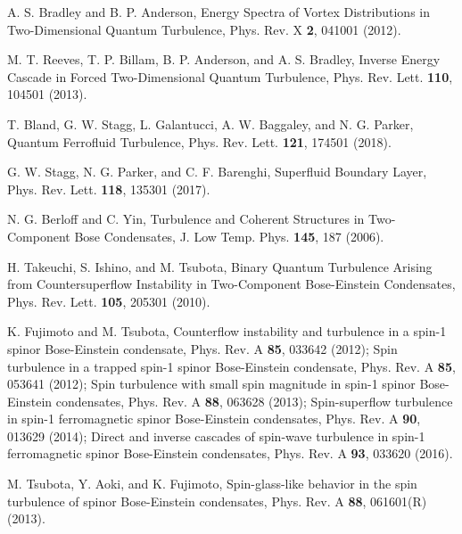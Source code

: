 \documentclass[12pt,a4paper]{jbook}
\begin{document}
\begin{thebibliography}{99}
        A. S. Bradley and B. P. Anderson,
        Energy Spectra of Vortex Distributions in Two-Dimensional Quantum
        Turbulence,
        Phys. Rev. X \textbf{2}, 041001 (2012).
        
        M. T. Reeves, T. P. Billam, B. P. Anderson, and A. S. Bradley,
        Inverse Energy Cascade in Forced Two-Dimensional Quantum Turbulence,
        Phys. Rev. Lett. \textbf{110}, 104501 (2013).
        
        T. Bland, G. W. Stagg, L. Galantucci, A. W. Baggaley, and N. G. Parker,
        Quantum Ferrofluid Turbulence,
        Phys. Rev. Lett. \textbf{121}, 174501 (2018).
        
        G. W. Stagg, N. G. Parker, and C. F. Barenghi,
        Superfluid Boundary Layer,
        Phys. Rev. Lett. \textbf{118}, 135301 (2017).

        N. G. Berloff and C. Yin,
        Turbulence and Coherent Structures in Two-Component Bose Condensates,
        J. Low Temp. Phys. \textbf{145}, 187 (2006).

        H. Takeuchi, S. Ishino, and M. Tsubota,
        Binary Quantum Turbulence Arising from Countersuperflow Instability in
        Two-Component Bose-Einstein Condensates,
        Phys. Rev. Lett. \textbf{105}, 205301 (2010).
        
        K. Fujimoto and M. Tsubota,
        Counterflow instability and turbulence in a spin-1 spinor Bose-Einstein
        condensate,
        Phys. Rev. A \textbf{85}, 033642 (2012);
        Spin turbulence in a trapped spin-1 spinor Bose-Einstein condensate,
        Phys. Rev. A \textbf{85}, 053641 (2012);
        Spin turbulence with small spin magnitude in spin-1 spinor Bose-Einstein
        condensates,
        Phys. Rev. A \textbf{88}, 063628 (2013);
        Spin-superflow turbulence in spin-1 ferromagnetic spinor Bose-Einstein
        condensates,
        Phys. Rev. A \textbf{90}, 013629 (2014);
        Direct and inverse cascades of spin-wave turbulence in spin-1 ferromagnetic
        spinor Bose-Einstein condensates,
        Phys. Rev. A \textbf{93}, 033620 (2016).
        
        M. Tsubota, Y. Aoki, and K. Fujimoto,
        Spin-glass-like behavior in the spin turbulence of spinor Bose-Einstein
        condensates,
        Phys. Rev. A \textbf{88}, 061601(R) (2013).


\end{thebibliography}
\end{document}
